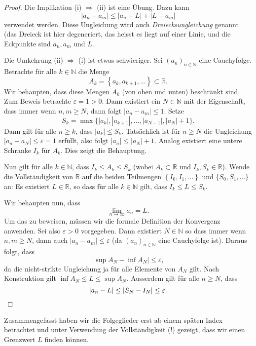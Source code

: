 \documentclass[../main.tex]{subfiles}
\begin{document}
\begin{proof}
  Die Implikation (i) $\Rightarrow$ (ii) ist eine Übung.
  Dazu kann  
  \[
    |a_n - a_m| \leq |a_n - L| + |L - a_m|
  \]
  verwendet werden. Diese Ungleichung wird auch
  \emph{Dreiecksungleichung} genannt (das Dreieck
  ist hier degeneriert, das heisst es liegt
  auf einer Linie, und die Eckpunkte sind
  $a_n, a_m$ und $L$.

  Die Umkehrung (ii) $\Rightarrow$ (i) ist etwas schwieriger.
Sei ${\left( a_n \right)}_{n \in \mathbb{N}}$ eine
  Cauchyfolge.
  Betrachte für alle $k \in \mathbb{N}$ die Menge
  \[
    A_k = \left\{ a_{k}, a_{k+1}, \dots \right\}
    \subset \mathbb{R}.
  \]
  Wir behaupten, dass diese Mengen $A_k$
  (von oben und unten)
  beschränkt sind.
  Zum Beweis betrachte $\varepsilon = 1 > 0$.
  Dann existiert ein $N \in \mathbb{N}$ mit
  der Eigenschaft, dass immer wenn
  $n, m \geq N$, dann folgt
  $|a_n - a_m| \leq 1$.
  Setze
  \[
  S_k = \max \{|a_k|, |a_{k+1}|, \dots, |a_{N-1}|, |a_N| + 1\}.
  \]
  Dann gilt für alle $n \geq k$, dass $|a_k| \leq S_k$.
  Tatsächlich ist für $n \geq N$ die Ungleichung
  $|a_n - a_N| \leq \varepsilon = 1$
  erfüllt, also folgt $|a_n| \leq |a_N| + 1$.
  Analog existiert eine untere Schranke $I_k$ für 
  $A_k$.
  Dies zeigt die Behauptung.

  Nun gilt für alle $k \in \mathbb{N}$, dass
  $I_k \leq A_k \leq S_k$ (wobei $A_k \subset \mathbb{R}$
  und $I_k, S_k \in \mathbb{R}$).
  Wende die Vollständigkeit von $\mathbb{R}$ 
  auf die beiden Teilmengen
  $\left\{ I_0, I_1, \dots \right\} $
  und $\{S_0, S_1, \dots\}$ an: Es existiert
  $L \in \mathbb{R}$, so dass für alle
  $k \in \mathbb{N}$ gilt, dass $I_k \leq L \leq S_k$.

  Wir behaupten nun, dass
  \[
    \lim_{n \to \infty} a_n = L.
  \]
  Um das zu beweisen, müssen wir die formale
  Definition der Konvergenz anwenden.
  Sei also $\varepsilon > 0$ vorgegeben.
  Dann existiert $N \in \mathbb{N}$ 
  so dass immer wenn $n, m \geq N$, dann auch
  $|a_n - a_m| \leq \varepsilon$
  (da ${(a_n)}_{n \in \mathbb{N}}$ eine Cauchyfolge ist).
  Daraus folgt, dass
  \[
    |\sup A_N - \inf A_N| \leq \varepsilon,
  \]
  da die nicht-strikte Ungleichung ja für alle
  Elemente von $A_N$ gilt.
  Nach Konstruktion gilt $\inf A_N \leq L \leq \sup A_N$.
  Ausserdem gilt für alle $n \geq N$, dass
  \[
    |a_n - L| \leq |S_N - I_N| \leq \varepsilon. \qedhere
  \]
\end{proof}

Zusammengefasst haben wir die Folgeglieder
erst ab einem späten Index betrachtet und
unter Verwendung der Vollständigkeit (!)
gezeigt, dass wir einen Grenzwert $L$
finden können.
\end{document}
